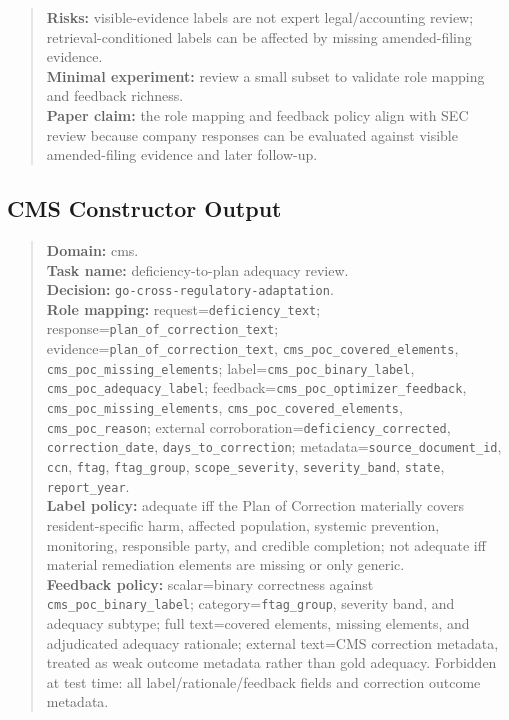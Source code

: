 \documentclass[11pt]{article}
\begin{document}
\begin{quote}
\textbf{Risks:} visible-evidence labels are not expert legal/accounting review; retrieval-conditioned labels can be affected by missing amended-filing evidence. \\
\textbf{Minimal experiment:} review a small subset to validate role mapping and feedback richness. \\
\textbf{Paper claim:} the role mapping and feedback policy align with SEC review because company responses can be evaluated against visible amended-filing evidence and later follow-up.
\end{quote}

\subsection{CMS Constructor Output}

\begin{quote}\small
\textbf{Domain:} cms. \\
\textbf{Task name:} deficiency-to-plan adequacy review. \\
\textbf{Decision:} \texttt{go-cross-regulatory-adaptation}. \\
\textbf{Role mapping:} request=\texttt{deficiency\_text}; response=\texttt{plan\_of\_correction\_text}; evidence=\texttt{plan\_of\_correction\_text}, \texttt{cms\_poc\_covered\_elements}, \texttt{cms\_poc\_missing\_elements}; label=\texttt{cms\_poc\_binary\_label}, \texttt{cms\_poc\_adequacy\_label}; feedback=\texttt{cms\_poc\_optimizer\_feedback}, \texttt{cms\_poc\_missing\_elements}, \texttt{cms\_poc\_covered\_elements}, \texttt{cms\_poc\_reason}; external corroboration=\texttt{deficiency\_corrected}, \texttt{correction\_date}, \texttt{days\_to\_correction}; metadata=\texttt{source\_document\_id}, \texttt{ccn}, \texttt{ftag}, \texttt{ftag\_group}, \texttt{scope\_severity}, \texttt{severity\_band}, \texttt{state}, \texttt{report\_year}. \\
\textbf{Label policy:} adequate iff the Plan of Correction materially covers resident-specific harm, affected population, systemic prevention, monitoring, responsible party, and credible completion; not adequate iff material remediation elements are missing or only generic. \\
\textbf{Feedback policy:} scalar=binary correctness against \texttt{cms\_poc\_binary\_label}; category=\texttt{ftag\_group}, severity band, and adequacy subtype; full text=covered elements, missing elements, and adjudicated adequacy rationale; external text=CMS correction metadata, treated as weak outcome metadata rather than gold adequacy. Forbidden at test time: all label/rationale/feedback fields and correction outcome metadata. \\

\end{quote}
\end{document}
